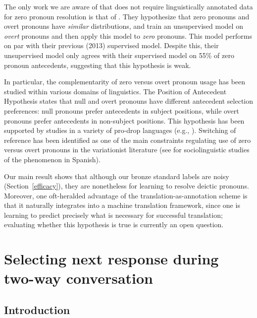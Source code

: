 \documentclass[11pt]{report}
\renewcommand\cite{\citep}	%
\begin{document}
The only work we are aware of that does not require linguistically annotated data for zero pronoun resolution is that of \cite{chenchinese}. They hypothesize that zero pronouns and overt pronouns have \emph{similar} distributions, and train an unsupervised model on \emph{overt} pronouns and then apply this model to \emph{zero} pronouns. This model performs on par with their previous (2013) supervised model. Despite this, their unsupervised model only agrees with their supervised model on 55\% of zero pronoun antecedents, suggesting that this hypothesis is weak.

In particular, the complementarity of zero versus overt pronoun usage has been studied within various domains of linguistics. The Position of Antecedent Hypothesis \cite{carminati2002processing} states that null and overt pronouns have different antecedent selection preferences: null pronouns prefer antecedents in subject positions, while overt pronouns prefer antecedents in non-subject positions. This hypothesis has been supported by studies in a variety of pro-drop languages (e.g., \cite{alonso2002null} \cite{kweon2011processing}). Switching of reference has been identified as one of the main constraints regulating use of zero versus overt pronouns in the variationist literature (see \cite{cameron1992pronominal} for sociolinguistic studies of the phenomenon in Spanish).%

Our main result shows that although our bronze standard labels are noisy (Section~\ref{efficacy}), they are nonetheless for learning to resolve deictic pronouns. Moreover, one oft-heralded advantage of the translation-as-annotation scheme \cite{carpuat07psd} is that it naturally integrates into a machine translation framework, since one is learning to predict precisely what is necessary for successful translation; evaluating whether this hypothesis is true is currently an open question.


\newpage

\chapter{Selecting next response during two-way conversation}\label{dialogue_next_response}

\section{Introduction}
\end{document}
